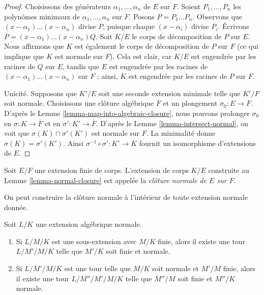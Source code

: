 \begin{proof}
Choisissons des générateurs $\alpha_1, \ldots, \alpha_n$ de $E$ sur $F$.
Soient $P_1, \ldots, P_n$ les polynômes minimaux de
$\alpha_1, \ldots, \alpha_n$ sur $F$. Posons $P = P_1 \ldots P_n$.
Observons que $(x - \alpha_1) \ldots (x - \alpha_n)$ divise $P$, puisque
chaque $(x - \alpha_i)$ divise $P_i$. Écrivons
$P = (x - \alpha_1) \ldots (x - \alpha_n)Q$.
Soit $K/E$ le corps de décomposition de $P$ sur $E$.
Nous affirmons que $K$ est également le corps de décomposition de $P$ sur $F$
(ce qui implique que $K$ est normale sur $F$).
Cela est clair, car $K/E$ est engendrée par les racines de
$Q$ sur $E$, tandis que $E$ est engendrée par les racines de
$(x - \alpha_1) \ldots (x - \alpha_n)$ sur $F$ ; ainsi,
$K$ est engendrée par les racines de $P$ sur $F$.

\medskip\noindent
Unicité. Supposons que $K'/E$ soit une seconde extension minimale telle que
$K'/F$ soit normale. Choisissons une clôture algébrique $\overline{F}$ et un
plongement $\sigma_0 : E \to \overline{F}$. D'après le
Lemme \ref{lemma-map-into-algebraic-closure},
nous pouvons prolonger $\sigma_0$ en $\sigma : K \to \overline{F}$ et en
$\sigma' : K' \to \overline{F}$.
D'après le Lemme \ref{lemma-intersect-normal}, on voit que
$\sigma(K) \cap \sigma'(K')$ est normale sur $F$.
La minimalité donne $\sigma(K) = \sigma'(K')$.
Ainsi $\sigma^{-1} \circ \sigma' : K' \to K$ fournit un isomorphisme
d'extensions de $E$.
\end{proof}

\begin{definition}
\label{definition-normal-closure}
Soit $E/F$ une extension finie de corps. L'extension de corps $K/E$
construite au Lemme \ref{lemma-normal-closure}
est appelée la {\it clôture normale de $E$ sur $F$}.
\end{definition}

\noindent
On peut construire la clôture normale à l'intérieur de toute extension normale donnée.

\begin{lemma}
\label{lemma-normal-closure-inside-normal}
Soit $L/K$ une extension algébrique normale.
\begin{enumerate}
\item Si $L/M/K$ est une sous-extension avec $M/K$ finie, alors il existe
une tour $L/M'/M/K$ telle que $M'/K$ soit finie et normale.
\item Si $L/M'/M/K$ est une tour telle que $M/K$ soit normale et $M'/M$ finie,
alors il existe une tour $L/M''/M'/M/K$ telle que $M''/M$ soit
finie et $M''/K$ normale.
\end{enumerate}
\end{lemma}

